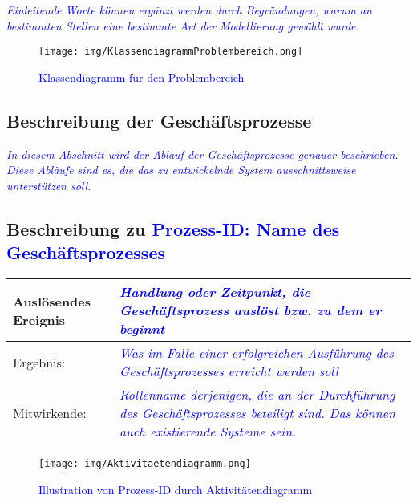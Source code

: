 \textcolor{blue}{\textit{Einleitende Worte können ergänzt werden durch Begründungen, warum an bestimmten Stellen eine bestimmte Art der Modellierung gewählt wurde.}}

\begin{figure}[H]
\centering
\texttt{[image: img/KlassendiagrammProblembereich.png]}
\caption{\textcolor{blue}{Klassendiagramm für den Problembereich}}
\label{KlassendiagramProblembereich}
\end{figure}

\subsection{Beschreibung der Geschäftsprozesse}
\textcolor{blue}{\textit{In diesem Abschnitt wird der Ablauf der Geschäftsprozesse genauer beschrieben. Diese Abläufe sind es, die das zu entwickelnde System ausschnittsweise unterstützen soll.}}

\subsection{Beschreibung zu \textcolor{blue}{Prozess-ID: Name des Geschäftsprozesses}}

\begin{table}[H]
    \begin{tabularx}{\textwidth}{| X | X |} 
	\hline    
    Auslösendes Ereignis & \textcolor{blue}{\textit{Handlung oder Zeitpunkt, die Geschäftsprozess auslöst bzw. zu dem er beginnt}} \\ \hline
    Ergebnis:            & \textcolor{blue}{\textit{Was im Falle einer erfolgreichen Ausführung des Geschäftsprozesses erreicht werden soll}} \\ \hline
    Mitwirkende:         & \textcolor{blue}{\textit{Rollenname derjenigen, die an der Durchführung des Geschäftsprozesses beteiligt sind. Das können auch existierende Systeme sein.}} \\ \hline
    \end{tabularx}
\end{table}

\begin{figure}[H]
\centering
\texttt{[image: img/Aktivitaetendiagramm.png]}
\caption{\textcolor{blue}{Illustration von Prozess-ID durch Aktivitätendiagramm}}
\label{Aktivitaetendiagramm}
\end{figure}
